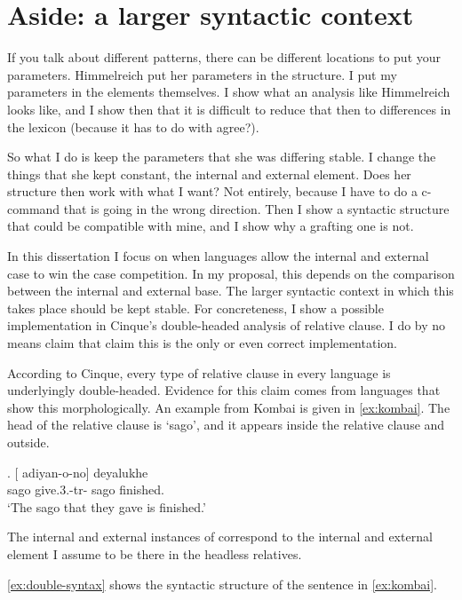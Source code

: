 \section{Aside: a larger syntactic context}

If you talk about different patterns, there can be different locations to put your parameters. Himmelreich put her parameters in the structure. I put my parameters in the elements themselves. I show what an analysis like Himmelreich looks like, and I show then that it is difficult to reduce that then to differences in the lexicon (because it has to do with agree?).

So what I do is keep the parameters that she was differing stable. I change the things that she kept constant, the internal and external element. Does her structure then work with what I want? Not entirely, because I have to do a c-command that is going in the wrong direction.
Then I show a syntactic structure that could be compatible with mine, and I show why a grafting one is not.



In this dissertation I focus on when languages allow the internal and external case to win the case competition. In my proposal, this depends on the comparison between the internal and external base. The larger syntactic context in which this takes place should be kept stable. For concreteness, I show a possible implementation in Cinque's double-headed analysis of relative clause. I do by no means claim that claim this is the only or even correct implementation.

According to Cinque, every type of relative clause in every language is underlyingly double-headed. Evidence for this claim comes from languages that show this morphologically. An example from Kombai is given in \ref{ex:kombai}. The head of the relative clause is  `sago', and it appears inside the relative clause and outside.

\exg. [ adiyan-o-no]  deyalukhe\\
 sago give.3.-{tr}- sago finished.\\
 `The sago that they gave is finished.' \label{ex:kombai}

The internal and external instances of  correspond to the internal and external element I assume to be there in the headless relatives.

\ref{ex:double-syntax} shows the syntactic structure of the sentence in \ref{ex:kombai}.

